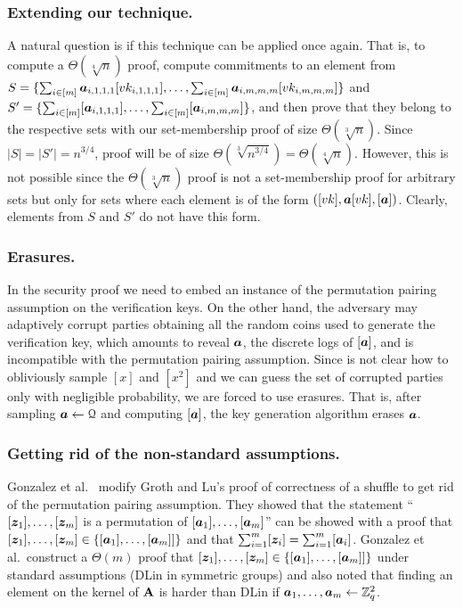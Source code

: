 \subsubsection{Extending our technique.}
A natural question is if this technique can be applied once again. That is, to compute a $\Theta(\sqrt[4]{n})$  proof, compute commitments to an element from $S=\{\sum_{i\in[m]}{\boldsymbol{a}}_{i,1,1,1}[vk_{i,1,1,1}],\ldots,\sum_{i\in[m]}{\boldsymbol{a}}_{i,m,m,m}[vk_{i,m,m,m}]\}$ and $S'=\allowbreak\{\sum_{i\in[m]}[{\boldsymbol{a}}_{i,1,1,1}],\ldots,\sum_{i\in[m]}[{\boldsymbol{a}}_{i,m,m,m}]\}$, and then prove that they belong to the respective sets with our set-membership proof of size $\Theta(\sqrt[3]{n})$. Since $|S|=|S'|=n^{3/4}$, proof will be of size $\Theta(\sqrt[3]{n^{3/4}})=\Theta(\sqrt[4]{n})$. However, this is not possible since the $\Theta(\sqrt[3]{n})$ proof is not a set-membership proof for arbitrary sets but only for sets where each element is of the form $([vk],{\boldsymbol{a}}[vk],[{\boldsymbol{a}}])$. Clearly, elements from $S$ and $S'$ do not have this form.


\subsubsection{Erasures.}
In the security proof we need to embed an instance of the permutation pairing assumption on the verification keys. On the other hand, the adversary may adaptively corrupt parties obtaining all the random coins used to generate the verification key, which amounts to reveal ${\boldsymbol{a}}$, the discrete logs of $[{\boldsymbol{a}}]$, and is incompatible with the permutation pairing assumption. Since is not clear how to obliviously sample $[x]$ and $[x^{2}]$ and we can guess the set of corrupted parties only with negligible probability, we are forced to use erasures. That is, after sampling ${\boldsymbol{a}}\gets\mathcal{Q}$ and computing $[{\boldsymbol{a}}]$, the key generation algorithm erases ${\boldsymbol{a}}$.

\subsubsection{Getting rid of the non-standard assumptions.} Gonzalez et al.~\cite{ACNS:GonRaf16} modify Groth and Lu's proof of correctness of a shuffle \cite{AC:GroLu07} to get rid of the permutation pairing assumption. They showed that the statement ``$[{\boldsymbol{z}}_1],\ldots,[{\boldsymbol{z}}_m]$ is a permutation of $[{\boldsymbol{a}}_1],\ldots,[{\boldsymbol{a}}_m]$'' can be showed with a proof that $[{\boldsymbol{z}}_1],\ldots,[{\boldsymbol{z}}_m]\in\{[{\boldsymbol{a}}_1],\ldots,[{\boldsymbol{a}}_m]]\}$ and that $\sum_{i=1}^m [{\boldsymbol{z}}_i]=\sum_{i=1}^m [{\boldsymbol{a}}_i]$.  Gonzalez et al.~construct a $\Theta(m)$ proof that $[{\boldsymbol{z}}_1],\ldots,[{\boldsymbol{z}}_m]\in\{[{\boldsymbol{a}}_1],\ldots,[{\boldsymbol{a}}_m]]\}$ under standard assumptions (DLin in symmetric groups)  and also noted that finding an element on the kernel of $\mathbf{{A}}$ is harder than DLin if ${\boldsymbol{a}}_1,\ldots,{\boldsymbol{a}}_m\gets\mathbb{Z}_q^2$.

